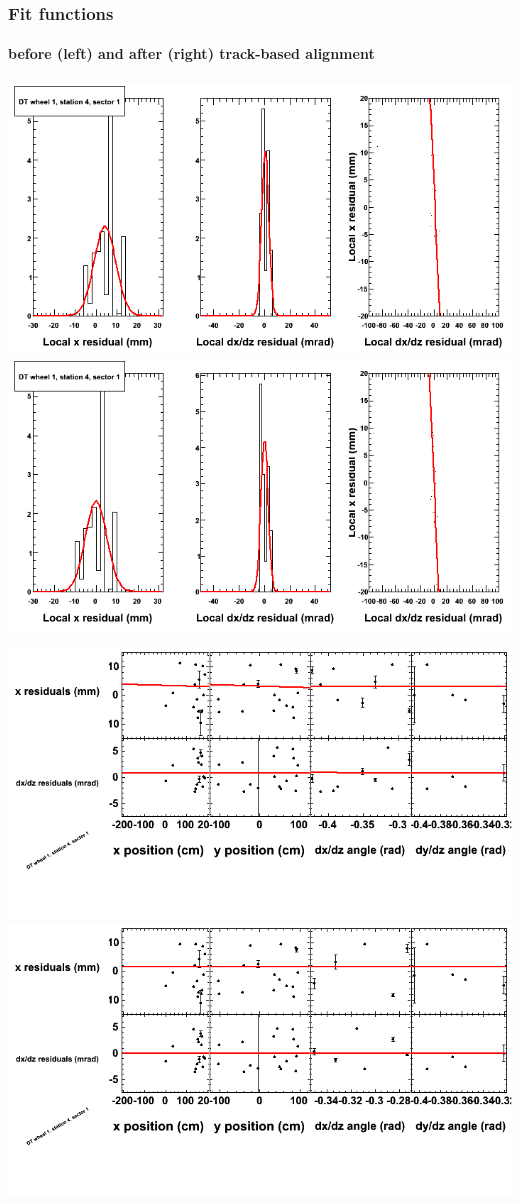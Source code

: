 \documentclass[compress]{beamer}
\begin{document}
\begin{frame}
\frametitle{Fit functions}
\framesubtitle{before (left) and after (right) track-based alignment}
\includegraphics[width=0.5\linewidth]{fitfunctions_re01/MBwhDst4sec01_bellcurves.png} \includegraphics[width=0.5\linewidth]{fitfunctions_re05/MBwhDst4sec01_bellcurves.png}

\includegraphics[width=0.5\linewidth]{fitfunctions_re01/MBwhDst4sec01_polynomials.png} \includegraphics[width=0.5\linewidth]{fitfunctions_re05/MBwhDst4sec01_polynomials.png}
\end{frame}
\end{document}

